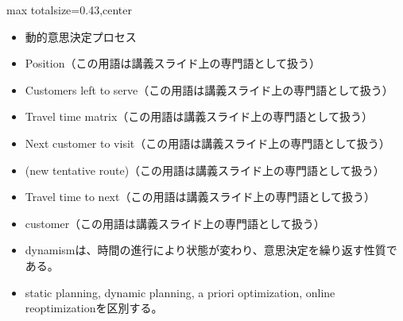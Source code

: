 \clearpage
{}
\begin{minipage}[t]{0.405\textwidth}
\begin{adjustbox}{max totalsize={\textwidth}{0.43\textheight},center}
\begin{minipage}{\textwidth}\scriptsize
{}\begin{itemize}
\item 動的意思決定プロセス
\item Position（この用語は講義スライド上の専門語として扱う）
\item Customers left to serve（この用語は講義スライド上の専門語として扱う）
\item Travel time matrix（この用語は講義スライド上の専門語として扱う）
\item Next customer to visit（この用語は講義スライド上の専門語として扱う）
\item (new tentative route)（この用語は講義スライド上の専門語として扱う）
\item Travel time to next（この用語は講義スライド上の専門語として扱う）
\item customer（この用語は講義スライド上の専門語として扱う）
\end{itemize}\begin{itemize}
\item dynamismは、時間の進行により状態が変わり、意思決定を繰り返す性質である。
\item static planning, dynamic planning, a priori optimization, online reoptimizationを区別する。
\end{itemize}
\end{minipage}
\end{adjustbox}
\end{minipage}\hfill
